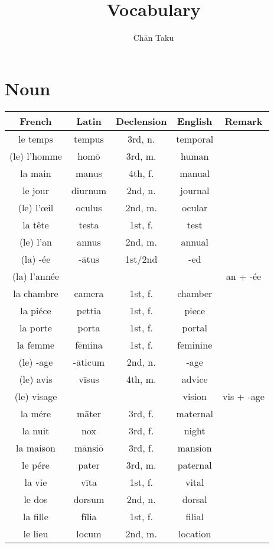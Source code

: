 \documentclass{article}
\title{Vocabulary}
\author{Ch\=an Taku}
\begin{document}
\maketitle

\section{Noun}

\begin{longtable}{ccccc}
    \toprule
    French & Latin & Declension & English & Remark \\
    \midrule
    le temps & tempus & 3rd, n. & temporal \\
    (le) l'homme & hom\=o & 3rd, m. & human \\
    la main & manus & 4th, f. & manual \\
    le jour & diurnum & 2nd, n. & journal \\
    (le) l'\oe il & oculus & 2nd, m. & ocular \\
    la t\^ete & testa & 1st, f. & test \\
    (le) l'an & annus & 2nd, m. & annual \\
    (la) -\'ee & -\=atus & 1st/2nd & -ed \\
    (la) l'ann\'ee & & & & an + -\'ee \\
    la chambre & camera & 1st, f. & chamber \\
    la pi\'ece & pettia & 1st, f. & piece \\
    la porte & porta & 1st, f. & portal \\
    la femme & f\=emina & 1st, f. & feminine \\
    (le) -age & -\=aticum & 2nd, n. & -age \\
    (le) avis & v\=isus & 4th, m. & advice \\
    (le) visage & & & vision & vis + -age \\
    la m\'ere & m\=ater & 3rd, f. & maternal \\
    la nuit & nox & 3rd, f. & night \\
    la maison & m\=ansi\=o & 3rd, f. & mansion \\
    le p\'ere & pater & 3rd, m. & paternal \\
    la vie & v\=ita & 1st, f. & vital \\
    le dos & dorsum & 2nd, n. & dorsal \\
    la fille & f\=ilia & 1st, f. & filial \\
    le lieu & locum & 2nd, m. & location \\

\end{longtable}
\end{document}
